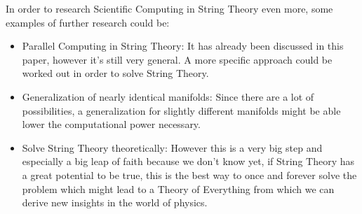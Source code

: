 \documentclass[../paper.tex]{subfiles}
\begin{document}
In order to research Scientific Computing in String Theory even more, some examples of further research could be:
\begin{itemize}
    \item Parallel Computing in String Theory:
    It has already been discussed in this paper, however it's still very general. A more specific approach could be worked out in order to solve String Theory.
    \item Generalization of nearly identical manifolds:
    Since there are a lot of possibilities, a generalization for slightly different manifolds might be able lower the computational power necessary.
    \item Solve String Theory theoretically:
    However this is a very big step and especially a big leap of faith because we don't know yet, if String Theory has a great potential to be true, this is the best way to once and forever solve the problem which might lead to a Theory of Everything from which we can derive new insights in the world of physics.
\end{itemize}
\end{document}
